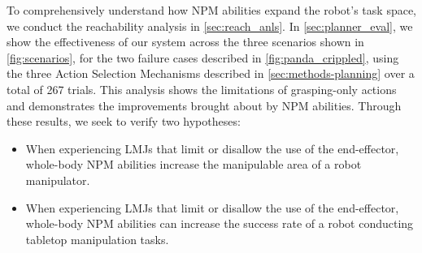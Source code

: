 
To comprehensively understand how NPM abilities expand the robot's task space, we conduct the reachability analysis in \cref{sec:reach_anls}. In \cref{sec:planner_eval}, we show the effectiveness of our system across the three scenarios shown in \cref{fig:scenarios}, for the two failure cases described in \cref{fig:panda_crippled}, using the three Action Selection Mechanisms described in \cref{sec:methods-planning} over a total of 267 trials. This analysis shows the limitations of grasping-only actions and demonstrates the improvements brought about by NPM abilities.
Through these results, we seek to verify two hypotheses:
\begin{itemize}
    \item[\textbf{H.1}] When experiencing LMJs that limit or disallow the use of the end-effector, whole-body NPM abilities increase the manipulable area of a robot manipulator.
    \item[\textbf{H.2}] When experiencing LMJs that limit or disallow the use of the end-effector, whole-body NPM abilities can increase the success rate of a robot conducting tabletop manipulation tasks.
\end{itemize}





% 

